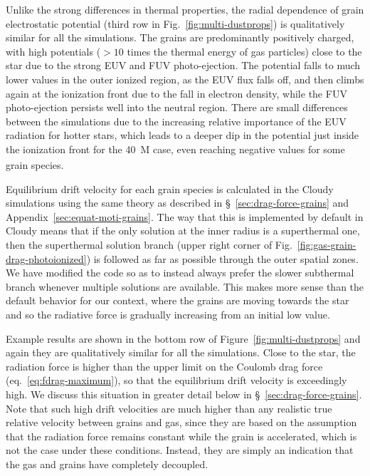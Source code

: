 Unlike the strong differences in thermal properties, the radial
dependence of grain electrostatic potential (third row in
Fig.~\ref{fig:multi-dustprops}) is qualitatively similar for all the
simulations.  The grains are predominantly positively charged, with high
potentials (\(> 10\) times the thermal energy of gas particles) close
to the star due to the strong EUV and FUV photo-ejection.  The
potential falls to much lower values in the outer ionized region, as
the EUV flux falls off, and then climbs again at the ionization front
due to the fall in electron density, while the FUV photo-ejection
persists well into the neutral region.  There are small differences
between the simulations due to the increasing relative importance of the
EUV radiation for hotter stars, which leads to a deeper dip in the
potential just inside the ionization front for the \SI{40}{M_\odot} case,
even reaching negative values for some grain species.

Equilibrium drift velocity for each grain species is calculated in the
Cloudy simulations using the same \citet{Draine:1979a} theory as
described in \S~\ref{sec:drag-force-grains} and
Appendix~\ref{sec:equat-moti-grains}.  The way that this is
implemented by default in Cloudy means that if the only solution at
the inner radius is a superthermal one, then the superthermal solution
branch (upper right corner of
Fig.~\ref{fig:gas-grain-drag-photoionized}) is followed as far as
possible through the outer spatial zones.  We have modified the code
so as to instead always prefer the slower subthermal branch whenever
multiple solutions are available.  This makes more sense than the
default behavior for our context, where the grains are moving towards
the star and so the radiative force is gradually increasing from an
initial low value.

Example results are shown in the bottom row of
Figure~\ref{fig:multi-dustprops} and again they are qualitatively
similar for all the simulations.  Close to the star, the radiation
force is higher than the upper limit on the Coulomb drag force
(eq.~\eqref{eq:fdrag-maximum}), so that the equilibrium drift velocity
is exceedingly high.  We discuss this situation in greater detail
below in \S~\ref{sec:drag-force-grains}.  Note that such high drift
velocities are much higher than any realistic true relative velocity
between grains and gas, since they are based on the assumption that
the radiation force remains constant while the grain is accelerated,
which is not the case under these conditions.  Instead, they are
simply an indication that the gas and grains have completely
decoupled.

